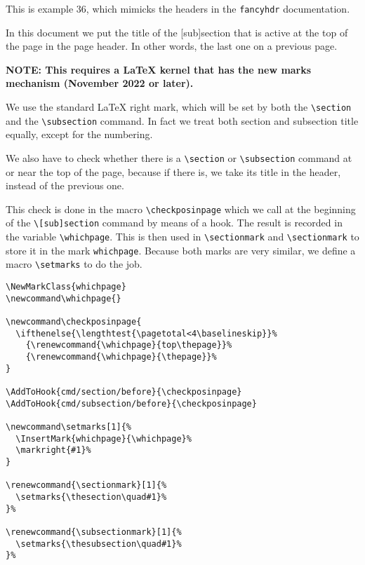 \documentclass{article}
\newcommand\whichpage{}
\newcounter{thispage}
\newcommand\checkposinpage{
  \ifthenelse{\lengthtest{\pagetotal<4\baselineskip}}%
    {\renewcommand{\whichpage}{top\thepage}}%
    {\renewcommand{\whichpage}{\thepage}}%
  \setcounter{thispage}{\thepage}%
}
\newcommand\setmarks[1]{%
  \InsertMark{whichpage}{\whichpage}%
  \markright{#1}%
}
\renewcommand{\sectionmark}[1]{%
  \setmarks{\thesection\quad#1}%
}%
\renewcommand{\subsectionmark}[1]{%
  \setmarks{\thesubsection\quad#1}%
}%
\begin{document}
\pagestyle{intro}
\thispagestyle{contents}
\tableofcontents

\bigskip

\noindent
\begin{boxedminipage}{\textwidth}
This is example 36, which mimicks the headers in the \texttt{fancyhdr} documentation.

In this document we put the title of the [sub]section that is active at the top of the page in the page header. In other words, the last one on a previous page.

\textbf{NOTE: This requires a \LaTeX{} kernel that has the new marks mechanism (November 2022 or later).}

We use the standard \LaTeX{} right mark, which will be set by both the \verb|\section| and the \verb|\subsection| command. In fact we treat both section and subsection title equally, except for the numbering.

We also have to check whether there is a \verb|\section| or \verb|\subsection| command at or near the top of the page, because if there is, we take its title in the header, instead of the previous one.

This check is done in the macro \verb|\checkposinpage| which we call at the beginning of the \verb|\[sub]section| command by means of a hook. The result is recorded in the variable \verb|\whichpage|. This is then used in \verb|\sectionmark| and  \verb|\sectionmark| to store it in the mark \texttt{whichpage}. Because both marks are very similar, we define a macro \verb|\setmarks| to do the job.

\begin{verbatim}
\NewMarkClass{whichpage}
\newcommand\whichpage{}

\newcommand\checkposinpage{
  \ifthenelse{\lengthtest{\pagetotal<4\baselineskip}}%
    {\renewcommand{\whichpage}{top\thepage}}%
    {\renewcommand{\whichpage}{\thepage}}%
}

\AddToHook{cmd/section/before}{\checkposinpage}
\AddToHook{cmd/subsection/before}{\checkposinpage}

\newcommand\setmarks[1]{%
  \InsertMark{whichpage}{\whichpage}%
  \markright{#1}%
}

\renewcommand{\sectionmark}[1]{%
  \setmarks{\thesection\quad#1}%
}%

\renewcommand{\subsectionmark}[1]{%
  \setmarks{\thesubsection\quad#1}%
}%
\end{verbatim}
\end{boxedminipage}
\end{document}
